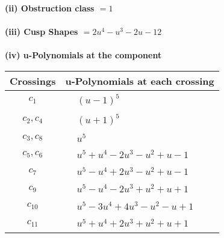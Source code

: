 \documentclass[1p]{elsarticle_modified}
\theoremstyle{definition}
\begin{document}
\flushleft \textbf{(ii) Obstruction class $= 1$}\\~\\
\flushleft \textbf{(iii) Cusp Shapes $= 2 u^4- u^3-2 u-12$}\\~\\
\newpage\renewcommand{\arraystretch}{1}
\flushleft \textbf{(iv) u-Polynomials at the component}\newline \\
\begin{tabular}{m{50pt}|m{274pt}}
Crossings & \hspace{64pt}u-Polynomials at each crossing \\
\hline $$\begin{aligned}c_{1}\end{aligned}$$&$\begin{aligned}
&(u-1)^5
\end{aligned}$\\
\hline $$\begin{aligned}c_{2},c_{4}\end{aligned}$$&$\begin{aligned}
&(u+1)^5
\end{aligned}$\\
\hline $$\begin{aligned}c_{3},c_{8}\end{aligned}$$&$\begin{aligned}
&u^5
\end{aligned}$\\
\hline $$\begin{aligned}c_{5},c_{6}\end{aligned}$$&$\begin{aligned}
&u^5+u^4-2 u^3- u^2+u-1
\end{aligned}$\\
\hline $$\begin{aligned}c_{7}\end{aligned}$$&$\begin{aligned}
&u^5- u^4+2 u^3- u^2+u-1
\end{aligned}$\\
\hline $$\begin{aligned}c_{9}\end{aligned}$$&$\begin{aligned}
&u^5- u^4-2 u^3+u^2+u+1
\end{aligned}$\\
\hline $$\begin{aligned}c_{10}\end{aligned}$$&$\begin{aligned}
&u^5-3 u^4+4 u^3- u^2- u+1
\end{aligned}$\\
\hline $$\begin{aligned}c_{11}\end{aligned}$$&$\begin{aligned}
&u^5+u^4+2 u^3+u^2+u+1
\end{aligned}$\\
\hline
\end{tabular}\\~\\
\end{document}
